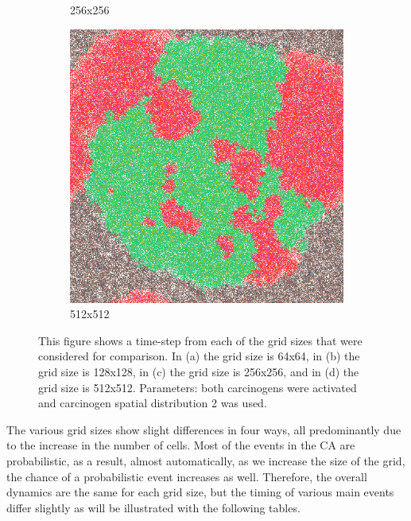 \documentclass[\main/thesis.tex]{subfiles}
\begin{document}
\begin{figure}[H]
\begin{subfigure}[t]{.47\textwidth}
        \caption{256x256}
        \label{fig:256x256TimeStep}
    \end{subfigure}
    \begin{subfigure}[t]{.47\textwidth}
        \centering
        \includegraphics[width=\textwidth]{images/3_GridSizeComparison/Fig1/4_512x512.jpeg}
        \caption{512x512}
        \label{fig:512x512TimeStep}
    \end{subfigure}
    \caption{This figure shows a time-step from each of the grid sizes that were considered for comparison. In (a) the grid size is 64x64, in (b) the grid size is 128x128, in (c) the grid size is 256x256, and in (d) the grid size is 512x512. Parameters: both carcinogens were activated and carcinogen spatial distribution 2 was used.}
    \label{fig:GridSizeComparisonTimeSteps}
\end{figure}
The various grid sizes show slight differences in four ways, all predominantly due to the increase in the number of cells. Most of the events in the CA are probabilistic, as a result, almost automatically, as we increase the size of the grid, the chance of a probabilistic event increases as well. Therefore, the overall dynamics are the same for each grid size, but the timing of various main events differ slightly as will be illustrated with the following tables. 
\end{document}
